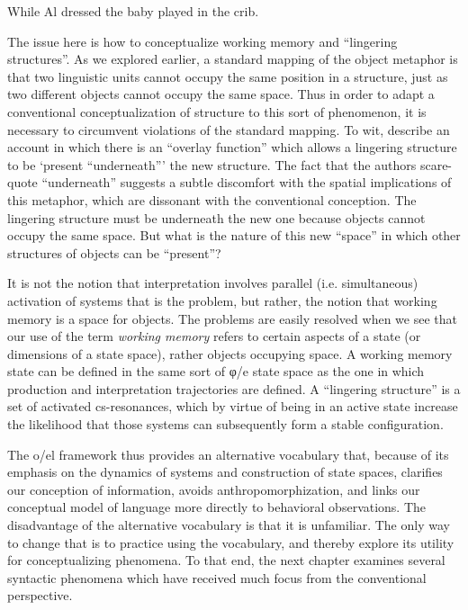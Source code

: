 \ea
{While Al dressed the baby played in the crib.}
\z

\ea
{}
\z
\z

The issue here is how to conceptualize working memory and “lingering structures”. As we explored earlier, a standard mapping of the object metaphor is that two linguistic units cannot occupy the same position in a structure, just as two different objects cannot occupy the same space. Thus in order to adapt a conventional conceptualization of structure to this sort of phenomenon, it is necessary to circumvent violations of the standard mapping. To wit, \citet{SlatteryEtAl2013} describe an account in which there is an “overlay function” which allows a lingering structure to be ‘present “underneath”’ the new structure. The fact that the authors scare-quote “underneath” suggests a subtle discomfort with the spatial implications of this metaphor, which are dissonant with the conventional conception. The lingering structure must be underneath the new one because objects cannot occupy the same space. But what is the nature of this new “space” in which other structures of objects can be “present”?

It is not the notion that interpretation involves parallel (i.e. simultaneous) activation of systems that is the problem, but rather, the notion that working memory is a space for objects. The problems are easily resolved when we see that our use of the term \textit{working memory} refers to certain aspects of a state (or dimensions of a state space), rather objects occupying space. A working memory state can be defined in the same sort of φ/e state space as the one in which production and interpretation trajectories are defined. A “lingering structure” is a set of activated cs-resonances, which by virtue of being in an active state increase the likelihood that those systems can subsequently form a stable configuration.

The o/el framework thus provides an alternative vocabulary that, because of its emphasis on the dynamics of systems and construction of state spaces, clarifies our conception of information, avoids anthropomorphization, and links our conceptual model of language more directly to behavioral observations. The disadvantage of the alternative vocabulary is that it is unfamiliar. The only way to change that is to practice using the vocabulary, and thereby explore its utility for conceptualizing phenomena. To that end, the next chapter examines several syntactic phenomena which have received much focus from the conventional perspective.  

